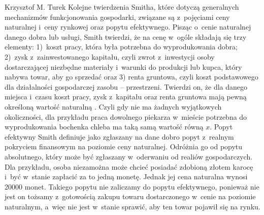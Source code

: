 \begin{artplenv}{Krzysztof M. Turek}
Kolejne twierdzenia Smitha, które dotyczą generalnych mechanizmów funkcjonowania gospodarki, związane są z~pojęciami
ceny naturalnej i~ceny rynkowej oraz popytu efektywnego. Pisząc o~cenie naturalnej danego dobra lub usługi, Smith
twierdzi, że na cenę w~ogóle składają się trzy elementy: 1)~koszt pracy, która była potrzebna do wyprodukowania dobra;
2)~zysk z~zainwestowanego kapitału, czyli zwrot z~inwestycji osoby dostarczającej niezbędne materiały i~warunki do
produkcji lub kupca, który nabywa towar, aby go sprzedać oraz 3) renta gruntowa, czyli koszt podstawowego dla
działalności gospodarczej zasobu -- przestrzeni. Twierdzi on, że dla danego miejsca i~czasu koszt pracy, zysk z~kapitału
oraz renta gruntowa mają pewną określoną wartość naturalną
\parencite[s.~66]{smith_badania_2007}.
Czyli gdy
nie ma żadnych wyjątkowych okoliczności, dla przykładu praca dowolnego piekarza w~mieście potrzebna do wyprodukowania
bochenka chleba ma taką samą wartość równą $x$. Popyt efektywny Smith definiuje jako zgłaszany na dane dobro
popyt z~realnym pokryciem finansowym na poziomie ceny naturalnej. Odróżnia go od popytu absolutnego, który może być
zgłaszany w~oderwaniu od realiów gospodarczych. Dla przykładu, osoba niezamożna może chcieć posiadać zdobioną złotem
karocę i~być w~stanie zapłacić za to jedną monetę. Jednak jej cena naturalna wynosi 20000 monet. Takiego popytu nie
zaliczamy do popytu efektywnego, ponieważ nie jest on tożsamy z~gotowością zakupu towaru dostarczonego w~cenie na
poziomie naturalnym, a~więc nie jest w~stanie sprawić, aby ten towar pojawił się na rynku.


\end{artplenv}
